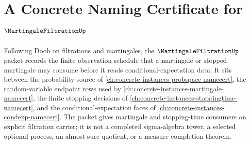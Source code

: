 \chapter{A Concrete Naming Certificate for $\MartingaleFiltrationUp$}
\label{ch:concrete-instances-martingale-filtration-namecert}

Following Doob on filtrations and martingales, the $\MartingaleFiltrationUp$ packet records the finite observation schedule that a martingale or stopped martingale may consume before it reads conditional-expectation data. It sits between the probability source of \autoref{ch:concrete-instances-probspace-namecert}, the random-variable endpoint rows used by \autoref{ch:concrete-instances-martingale-namecert}, the finite stopping decisions of \autoref{ch:concrete-instances-stoppingtime-namecert}, and the conditional-expectation faces of \autoref{ch:concrete-instances-condexp-namecert}. The packet gives martingale and stopping-time consumers an explicit filtration carrier; it is not a completed sigma-algebra tower, a selected optional process, an almost-sure quotient, or a measure-completion theorem.

